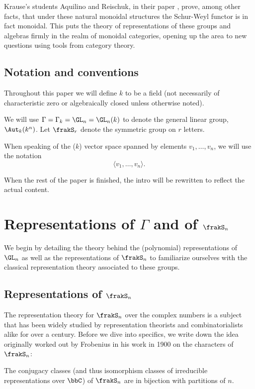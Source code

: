\documentclass[12pt]{article}
\begin{document}
Krause's students Aquilino and Reischuk, in their paper \cite{aquilino-reischuk}, prove, among other facts, that 
under these natural monoidal structures the Schur-Weyl functor is in fact monoidal. This puts the theory of representations 
of these groups and algebras firmly in the realm of monoidal categories, opening up the area to new questions using 
tools from category theory.

\subsection{Notation and conventions}\label{subsec:notation}
Throughout this paper we will define $k$ to be a field (not necessarily of characteristic zero or algebraically closed unless otherwise noted).

We will use $\Gamma=\Gamma_k=\GL_n=\GL_n(k)$ to denote the general linear group, $\Aut_k(k^n)$. Let $\frakS_r$ denote the symmetric group on $r$ letters.

When speaking of the ($k$) vector space spanned by elements $v_1,\dots,v_n$, we will use the notation 
\[\langle v_1,\dots, v_n\rangle.\]

{\color{red} When the rest of the paper is finished, the intro will be rewritten to reflect the actual content.}


\newpage
\section{Representations of \texorpdfstring{$\Gamma$}{Gamma} and of \texorpdfstring{$\frakS_n$}{Sn}}
We begin by detailing the theory behind the (polynomial) representations of $\GL_n$ as well as the representations of $\frakS_n$ to 
familiarize ourselves with the classical representation theory associated to these groups.

\subsection{Representations of \texorpdfstring{$\frakS_n$}{Sn}}
The representation theory for $\frakS_n$ over the complex numbers is a subject that has been widely studied by representation theorists 
and combinatorialists alike for over a century. Before we dive into specifics, we write down the idea originally worked out by Frobenius \cite{frobenius-charaktere}
in his work in 1900 on the characters of $\frakS_n$:
\begin{thm}\label{thm:frob-conj}
	The conjugacy classes (and thus isomorphism classes of irreducible representations over $\bbC$) of $\frakS_n$
	are in bijection with partitions of $n$.
\end{thm}
\end{document}
